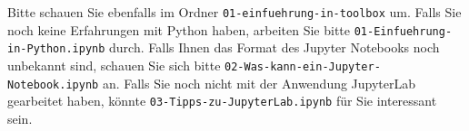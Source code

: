 \documentclass[nobib]{tufte-handout}
\begin{document}
Bitte schauen Sie ebenfalls im Ordner
\texttt{01-einfuehrung-in-toolbox}
um.
Falls Sie noch keine Erfahrungen mit Python haben, arbeiten Sie bitte
\texttt{01-Einfuehrung-in-Python.ipynb}
durch.
Falls Ihnen das Format des Jupyter Notebooks noch unbekannt sind, schauen Sie sich bitte
\texttt{02-Was-kann-ein-Jupyter-Notebook.ipynb}
an.
Falls Sie noch nicht mit der Anwendung JupyterLab gearbeitet haben, könnte 
\texttt{03-Tipps-zu-JupyterLab.ipynb}
für Sie interessant sein.

\FloatBarrier{}
\doclicenseThis{}
\end{document}
